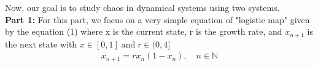 
Now, our goal is to study chaos in dynamical systems using two systems. \\

\textbf{Part 1:} For this part, we focus on a very simple equation of "logistic map" given by the equation (1) where x is the current state, r is the growth rate, and $x_{n+1}$ is the next state with $x \in [0,1] \; \text{and} \; r \in (0,4]$
\begin{align}
    x_{n+1} = rx_n(1 - x_n), \quad n \in \mathbb{N}
\end{align}

